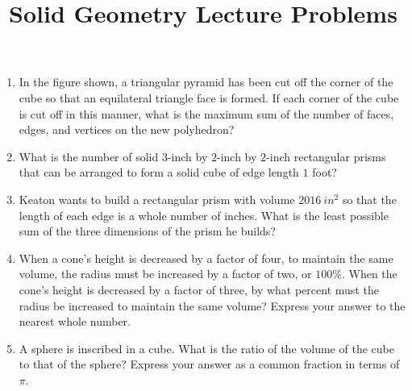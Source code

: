 \documentclass{article}
\title{Solid Geometry Lecture Problems}
\author{}
\date{}
\begin{document}
\maketitle

\begin{enumerate}
    \item In the figure shown, a triangular pyramid has been cut off the corner of the cube so that an equilateral triangle face is formed.
        If each corner of the cube is cut off in this manner, what is the maximum sum of the number of faces, edges, and vertices on the new polyhedron?
        \begin{center}
        \end{center}
    \vspace{0.5cm}
    \item What is the number of solid $3$-inch by $2$-inch by $2$-inch rectangular prisms that can be arranged to form a solid cube of edge length $1$ foot?
        \vspace{3cm}
    \item Keaton wants to build a rectangular prism with volume $\SI{2016}{in^2}$ so that the length of each edge is a whole number of inches.
        What is the least possible sum of the three dimensions of the prism he builds?
    \vspace{3cm}
    \item When a cone's height is decreased by a factor of four, to maintain the same volume, the radius must be increased by a factor of two, or $100\%$.
        When the cone's height is decreased by a factor of three, by what percent must the radius be increased to maintain the same volume?
        Express your answer to the nearest whole number.
    \vspace{3cm}
    \item A sphere is inscribed in a cube.
        What is the ratio of the volume of the cube to that of the sphere?
        Express your answer as a common fraction in terms of $\pi$.
\vspace{3cm}
\end{enumerate}
\end{document}
